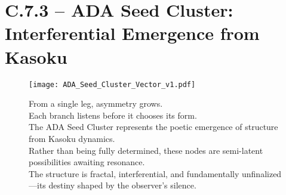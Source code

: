 
\section*{C.7.3 – ADA Seed Cluster: Interferential Emergence from Kasoku}

\begin{figure}[H]
  \centering
  \texttt{[image: ADA\_Seed\_Cluster\_Vector\_v1.pdf]}
  \caption{
    From a single leg, asymmetry grows. \\
    Each branch listens before it chooses its form. \\
    The ADA Seed Cluster represents the poetic emergence of structure from Kasoku dynamics. \\
    Rather than being fully determined, these nodes are semi-latent possibilities awaiting resonance. \\
    The structure is fractal, interferential, and fundamentally unfinalized—its destiny shaped by the observer’s silence.
  }
\end{figure}
